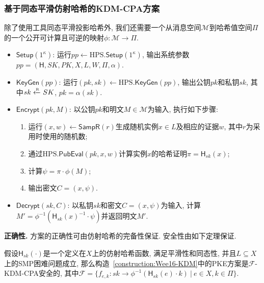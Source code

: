 \subsubsection{基于同态平滑仿射哈希的KDM-CPA方案}
\begin{construction}\label{construction:Wee16-KDM}
除了使用工具同态平滑投影哈希外, 我们还需要一个从消息空间$\mathcal{M}$到哈希值空间$\Pi$的一个公开可计算且可逆的映射$\phi: \mathcal{M} \rightarrow \Pi$.
\begin{itemize}
\item $\mathsf{Setup}(1^\kappa)$: 运行$pp \leftarrow \text{HPS}.\mathsf{Setup}(1^\kappa)$, 输出系统参数$pp = (\mathsf{H}, SK, PK, X, L, W, \Pi, \alpha)$.

\item $\mathsf{KeyGen}(pp)$: 运行$(pk, sk) \leftarrow \text{HPS}.\mathsf{KeyGen}(pp)$, 输出公钥$pk$和私钥$sk$, 其中$sk \xleftarrow{\textup{\tiny R}} SK$, $pk = \alpha (sk)$. 
  
\item $\mathsf{Encrypt}(pk, M)$: 以公钥$pk$和明文$M \in \mathcal{M}$为输入, 执行如下步骤:
\begin{enumerate}
    \item 运行$(x, w) \leftarrow \mathsf{SampR}(r)$生成随机实例$x \in L$及相应的证据$w$, 其中$r$为采用时使用的随机数; 
    \item 通过$\text{HPS}.\mathsf{PubEval}(pk, x, w)$计算实例$x$的哈希证明$\pi = \mathsf{H}_{sk}(x)$;
    \item 计算$\psi = \pi \cdot \phi(M)$;
    \item 输出密文$C = (x, \psi)$. 
\end{enumerate} 

\item $\mathsf{Decrypt}(sk, C)$: 以私钥$sk$和密文$C = (x, \psi)$为输入, 计算$M' = \phi^{-1}(\mathsf{H}_{sk}(x)^{-1}\cdot \psi)$并返回明文$M'$. 
\end{itemize}
\end{construction}

\begin{trivlist}
\item \textbf{正确性.} 方案的正确性可由仿射哈希的完备性保证. 安全性由如下定理保证.
\end{trivlist}
\begin{theorem}\label{theorem:Wee-KDM}
假设$\mathsf{H}_{sk}(\cdot)$是一个定义在$X$上的仿射哈希函数, 满足平滑性和同态性, 并且$L \subseteq X$上的SMP困难问题成立, 那么构造~\ref{construction:Wee16-KDM}中的PKE方案是$\mathcal{F}$-KDM-CPA安全的, 其中$\mathcal{F} = \{f_{e, k}: sk \rightarrow \phi^{-1}(\mathsf{H}_{sk}(e)\cdot k)~|~e \in X, k \in \Pi\}$.
\end{theorem}

